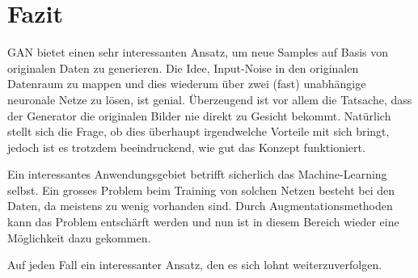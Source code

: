 \chapter{Fazit}
\Gls{GAN} bietet einen sehr interessanten Ansatz, um neue Samples auf Basis von originalen Daten zu generieren.
Die Idee, Input-Noise in den originalen Datenraum zu mappen und dies wiederum über zwei (fast) unabhängige
neuronale Netze zu lösen, ist genial. Überzeugend ist vor allem die Tatsache, dass der Generator die originalen Bilder
nie direkt zu Gesicht bekommt. Natürlich stellt sich die Frage, ob dies überhaupt irgendwelche Vorteile mit sich bringt,
jedoch ist es trotzdem beeindruckend, wie gut das Konzept funktioniert.

Ein interessantes Anwendungsgebiet betrifft sicherlich das Machine-Learning selbst. Ein grosses Problem beim Training von
solchen Netzen besteht bei den Daten, da meistens zu wenig vorhanden sind.
Durch Augmentationsmethoden kann das Problem entschärft werden und nun ist in diesem Bereich wieder eine Möglichkeit
dazu gekommen.

Auf jeden Fall ein interessanter Ansatz, den es sich lohnt weiterzuverfolgen.